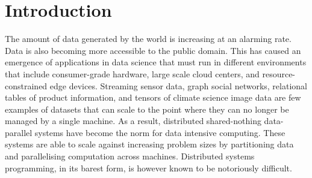 \section{Introduction}

% 

The amount of data generated by the world is increasing at an alarming rate. Data is also becoming more accessible to the public domain. This has caused an emergence of applications in data science that must run in different environments that include consumer-grade hardware, large scale cloud centers, and resource-constrained edge devices. Streaming sensor data, graph social networks, relational tables of product information, and tensors of climate science image data are few examples of datasets that can scale to the point where they can no longer be managed by a single machine. As a result, distributed shared-nothing data-parallel systems have become the norm for data intensive computing. These systems are able to scale against increasing problem sizes by partitioning data and parallelising computation across machines. Distributed systems programming, in its barest form, is however known to be notoriously difficult.

